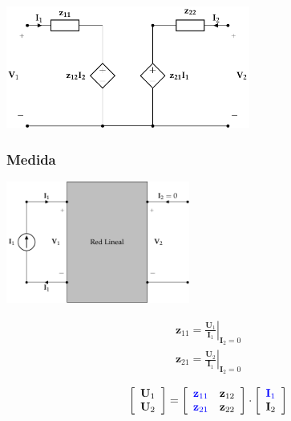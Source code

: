\documentclass[10pt]{article}
\begin{document}
\begin{center}
\includegraphics[height=4cm]{../figs/circuitoEquivalenteZ.pdf}
\end{center}

\subsubsection*{Medida}

\begin{minipage}{0.5\textwidth}
  \begin{center}
    \includegraphics[height=4cm]{../figs/parametrosZ_entrada.pdf}
  \end{center}
\end{minipage}
\begin{minipage}{0.5\textwidth}
  \[
    \begin{array}{c}
      \mathbf{z}_{11} = \left.\frac{\mathbf{U}_1}{\mathbf{I}_1}\right\rvert_{\mathbf{I}_2 = 0} \\
      \mathbf{z}_{21} = \left.\frac{\mathbf{U}_2}{\mathbf{I}_1}\right\rvert_{\mathbf{I}_2 = 0}
    \end{array}
  \]

  \[
    \left[
      \begin{array}{c}
        \mathbf{U}_1\\
        \mathbf{U}_2
      \end{array}
    \right] =
    \left[
      \begin{array}{cc}
        \color{blue}{\mathbf{z}_{11}} & \mathbf{z}_{12}\\
        \color{blue}{\mathbf{z}_{21}} & \mathbf{z}_{22}
      \end{array}
    \right] \cdot
    \left[
      \begin{array}{c}
        \color{blue}{\mathbf{I}_1}\\
        \mathbf{I}_2
      \end{array}
    \right]
  \]
\end{minipage}
\end{document}
